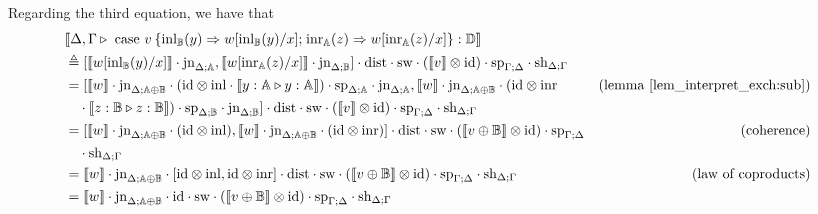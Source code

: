 \documentclass[10pt,a4paper]{amsart}
\theoremstyle{definition}
\theoremstyle{definition}
\theoremstyle{definition}
\theoremstyle{definition}
\theoremstyle{definition}
\theoremstyle{definition}
\begin{document}
Regarding the third equation, we have that
\begin{align*}
  & \llbracket \Delta,\Gamma \vljud \text{ case } v \hspace{2pt} \{\text{inl}_{\typeB} (y) \Rightarrow w [ \text{inl}_{\typeB}(y)/x] ; \hspace{1pt} \text{inr}_{\typeA} (z) \Rightarrow w [ \text{inr}_{\typeA}(z)/x]\}: \typeD\rrbracket \\
  & \triangleq  [\llbracket  w [ \text{inl}_{\typeB}(y)/x] \rrbracket \cdot \text{jn}_{\Delta;\typeA} ,\llbracket  w [ \text{inr}_{\typeA}(z)/x] \rrbracket \cdot \text{jn}_{\Delta;\typeB} ] \cdot \text{dist} \cdot \text{sw}  \cdot (\llbracket v\rrbracket \otimes \text{id}) \cdot  \text{sp}_{\Gamma;\Delta} \cdot \text{sh}_{\Delta;\Gamma} \\
  & =  [\llbracket w \rrbracket \cdot \text{jn}_{\Delta;\typeA \oplus \typeB} \cdot (\text{id} \otimes\inl \cdot  \llbracket y:\typeA \vljud y:\typeA  \rrbracket) \cdot \text{sp}_{\Delta;\typeA} \cdot \text{jn}_{\Delta;\typeA}, 
  \llbracket w \rrbracket \cdot \text{jn}_{\Delta;\typeA \oplus \typeB} \cdot (\text{id} \otimes\inr  & {\text{(lemma \ref{lem_interpret_exch:sub})}} \\
  &  \hspace{10pt} \cdot \llbracket z:\typeB \vljud z:\typeB  \rrbracket) \cdot \text{sp}_{\Delta;\typeB} \cdot \text{jn}_{\Delta;\typeB} ] \cdot \text{dist} \cdot \text{sw} \cdot (\llbracket v\rrbracket \otimes \text{id}) \cdot  \text{sp}_{\Gamma;\Delta} \cdot \text{sh}_{\Delta;\Gamma}  \\
  & = [\llbracket w \rrbracket \cdot \text{jn}_{\Delta;\typeA \oplus \typeB} \cdot (\text{id} \otimes\inl) , \llbracket  w \rrbracket  \cdot \text{jn}_{\Delta;\typeA \oplus \typeB}   \cdot (\text{id} \otimes\inr) ] \cdot \text{dist} \cdot \text{sw}  \cdot (\llbracket v \oplus \typeB\rrbracket \otimes \text{id})  \cdot  \text{sp}_{\Gamma;\Delta}  & {\text{(coherence)}}   \\
  & \hspace{10pt}  \cdot \text{sh}_{\Delta;\Gamma} \\
  & = \llbracket w \rrbracket \cdot \text{jn}_{\Delta;\typeA \oplus \typeB} \cdot [\text{id} \otimes\inl, \text{id} \otimes\inr] \cdot \text{dist} \cdot \text{sw}  \cdot (\llbracket v \oplus \typeB\rrbracket \otimes \text{id})  \cdot  \text{sp}_{\Gamma;\Delta} \cdot \text{sh}_{\Delta;\Gamma}  & {\text{(law of coproducts)}}  \\
  & = \llbracket w \rrbracket \cdot \text{jn}_{\Delta;\typeA \oplus \typeB} \cdot  \text{id} \cdot \text{sw}  \cdot (\llbracket v \oplus \typeB\rrbracket \otimes \text{id})  \cdot  \text{sp}_{\Gamma;\Delta} \cdot \text{sh}_{\Delta;\Gamma}  \\

\end{align*}
\end{document}
